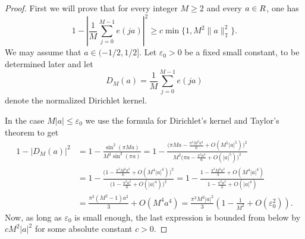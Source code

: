 \documentclass{article}
\newcommand{\R}{\mathbb R}
\newcommand{\T}{\mathbb T}
\theoremstyle{plain}
\numberwithin{equation}{section}
\begin{document}
\begin{proof}
First we will prove that for every integer $M\geq2$ and every $a\in\mathbb \R$, one has
\begin{equation}\label{eq:euclidean-linear-phase}
 1-\left|\frac1M\sum_{j=0}^{M-1}e(ja)\right|^2
 \geq c\min\{1,M^2\|a\|_{\T}^2\}.
\end{equation}
We may assume that $a \in (-1/2, 1/2]$. Let $\varepsilon_0>0$ be a fixed small constant, to be determined later and let 
\begin{equation*}
    D_M(a)= \frac{1}{M} \sum_{j=0}^{M-1} e(ja)
\end{equation*}
denote the normalized Dirichlet kernel. 

In the case $M|a| \le \varepsilon_0$ we use the formula for Dirichlet's kernel and Taylor's theorem to get 
\begin{align*}
1-\left|D_M(a)\right|^2
&=1-\frac{\sin^2(\pi Ma)}{M^2\sin^2(\pi a)}=1-
\frac{\Big(\pi Ma-\frac{\pi^3M^3a^3}{6}
+O(M^5|a|^5)\Big)^2}
{M^2\Big(\pi a-\frac{\pi^3a^3}{6}
+O(|a|^5)\Big)^2}\\
&=1-
\frac{\Big(1-\frac{\pi^2M^2a^2}{6}
+O(M^4|a|^4)\Big)^2}
{\Big(1-\frac{\pi^2a^2}{6}
+O(|a|^4)\Big)^2}=1-
\frac{1-\frac{\pi^2M^2a^2}{3}
+O(M^4|a|^4)}
{1-\frac{\pi^2a^2}{3}
+O(|a|^4)}\\
&=\frac{\pi^2(M^2-1)a^2}{3}
+O(M^4a^4)=\frac{\pi^2M^2|a|^2}{3}
\left(1-\frac{1}{M^2}+O(\varepsilon_0^2)\right).
\end{align*}
Now, as long as $\varepsilon_0$ is small enough, the last expression is bounded from below by $cM^2|a|^2$ for some absolute constant $c>0$.


\end{proof}
\end{document}
